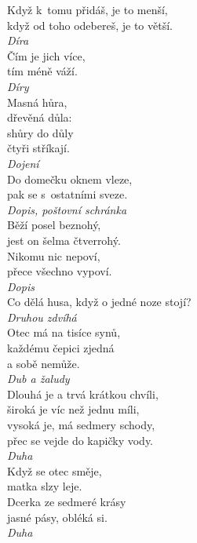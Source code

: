 \begin{multicols}{3}
\noindent
Když k~tomu přidáš, je to menší,\\
když od toho odebereš, je to větší.\\[1 mm]
{\sl Díra}\\

\noindent
Čím je jich více,\\
tím méně váží.\\[1 mm]
{\sl Díry}\\

\noindent
Masná hůra,\\
dřevěná důla:\\
shůry do důly\\
čtyři stříkají.\\[1 mm]
{\sl Dojení}\\

\noindent
Do domečku oknem vleze,\\
pak se s~ostatními sveze.\\[1 mm]
{\sl Dopis, poštovní schránka}\\

\noindent
Běží posel beznohý,\\
jest on šelma čtverrohý.\\
Nikomu nic nepoví,\\
přece všechno vypoví.\\[1 mm]
{\sl Dopis}\\

\noindent
Co dělá husa, když o jedné noze stojí?\\[1 mm]
{\sl Druhou zdvíhá}\\

\noindent
Otec má na tisíce synů,\\
každému čepici zjedná\\
a sobě nemůže.\\[1 mm]
{\sl Dub a žaludy}\\

\noindent
Dlouhá je a trvá krátkou chvíli,\\
široká je víc než jednu míli,\\
vysoká je, má sedmery schody,\\
přec se vejde do kapičky vody.\\[1 mm]
{\sl Duha}\\

\noindent
Když se otec směje,\\
matka slzy leje.\\
Dcerka ze sedmeré krásy\\
jasné pásy, obléká si.\\[1 mm]
{\sl Duha}\\


\end{multicols}

